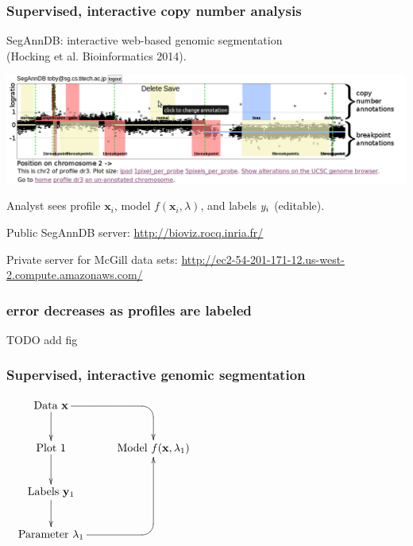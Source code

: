 \documentclass{beamer}
\begin{document}
\begin{frame}
  \frametitle{Supervised, interactive copy number analysis}

  SegAnnDB: interactive web-based genomic segmentation\\
  (Hocking et al. Bioinformatics 2014).
  \begin{center}
\includegraphics[width=\textwidth]{new-new-annotations}
  \end{center}
  Analyst sees profile $\mathbf x_i$, model $f(\mathbf x_i, \lambda)$,
  and labels $\mathbf \mathbf y_i$ (editable).

  \vskip 0.1in Public SegAnnDB
  server: \url{http://bioviz.rocq.inria.fr/}

\vskip 0.1in
Private server for McGill data sets:
\small
\url{http://ec2-54-201-171-12.us-west-2.compute.amazonaws.com/}

\end{frame}

\begin{frame}
  \frametitle{error decreases as profiles are labeled}
  TODO add fig
\end{frame}

\begin{frame}
  \frametitle{Supervised, interactive genomic segmentation}
  \small
  \begin{displaymath}
  \xymatrix{
    \text{Data $\mathbf x$}
    \ar `[r] [dr] 
    \ar [d]
    & \text{ }
    & \text{ }
    & \text{ }
    \\
    \text{Plot 1} 
    \ar [d]
    & 
    \text{Model $f(\mathbf x, \lambda_1)$} 
    &
    \color{white}{\text{Plot 2} }
    & 
    \color{white}{\text{Model $f(\mathbf x, \lambda_2)$} }
    \\
    \text{Labels $\mathbf y_1$}       
    \ar [d]
    &
    &
    \color{white}{\text{Labels $\mathbf y_2$}}
    \\
    \text{Parameter $\lambda_1$} 
    \ar `r[ruu] [ruu]
    & \text{ }
    & 
    \color{white}{\text{Parameter $\lambda_2$}}
  }
  \end{displaymath}
\end{frame}
\end{document}
